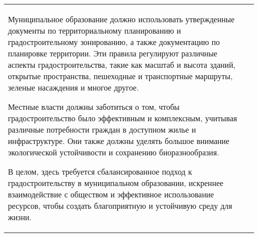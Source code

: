 \begin{center}
\begin{supertabular}{l | p{12cm}}
{        Муниципальное образование должно использовать утвержденные документы по территориальному планированию и градостроительному зонированию, а также документацию по планировке территории. Эти правила регулируют различные аспекты градостроительства, такие как масштаб и высота зданий, открытые пространства, пешеходные и транспортные маршруты, зеленые насаждения и многое другое.
        
        Местные власти должны заботиться о том, чтобы градостроительство было эффективным и комплексным, учитывая различные потребности граждан в доступном жилье и инфраструктуре. Они также должны уделять большое внимание экологической устойчивости и сохранению биоразнообразия.
        
        В целом, здесь требуется сбалансированное подход к градостроительству в муниципальном образовании, искреннее взаимодействие с обществом и эффективное использование ресурсов, чтобы создать благоприятную и устойчивую среду для жизни.}\\


\end{supertabular}
\end{center}
